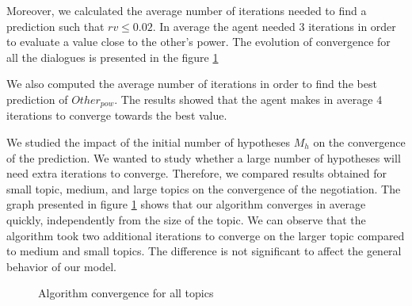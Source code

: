 \documentclass[conference, letterpaper]{IEEEtran}
\begin{document}
	Moreover, we calculated the average number of iterations needed to find a prediction such that $rv \leq 0.02$. In average the agent needed $3$ iterations in order to evaluate a value close to the other's power. The evolution of convergence for all the dialogues is presented in the figure \ref{fig:converge}
	
	We also computed the average number of iterations in order to find the best prediction of $Other_{pow}$. The results showed that the agent makes in average $4$ iterations to converge towards the best value.  

	
	We studied the impact of the initial number of hypotheses $M_h$ on the convergence of the prediction. We wanted to study whether a large number of hypotheses will need extra iterations to converge. Therefore, we compared results obtained for small topic, medium, and large topics on the convergence of the negotiation. The graph presented in figure \ref{fig:converge} shows that our algorithm converges in average quickly, independently from the size of the topic. We can observe that the algorithm took two additional iterations to converge on the larger topic compared to medium and small topics. The difference is not significant to affect the general behavior of our model.
	
	\begin{figure}[]
		\caption{Algorithm convergence for all topics} 
		\label{fig:converge}
	\end{figure}
	
\end{document}
